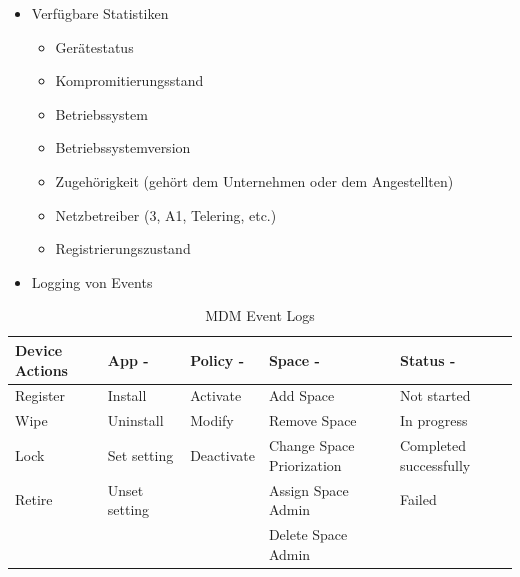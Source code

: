 \begin{itemize}
\begin{itemize}
		\item Verfügbare Statistiken 
		\begin{itemize}
			\item Gerätestatus
			\item Kompromitierungsstand
			\item Betriebssystem
			\item Betriebssystemversion
			\item Zugehörigkeit (gehört dem Unternehmen oder dem Angestellten)
			\item Netzbetreiber (3, A1, Telering, etc.)
			\item Registrierungszustand 
		\end{itemize}
		\item Logging von Events
	\end{itemize}
\end{itemize}	

\begin{table}[h]
\centering
\begin{tabular}{|l|l|l|l|l|}
\hline
\textbf{Device Actions} & \textbf{App -} & \textbf{Policy -} & \textbf{Space -}          & \textbf{Status -}      \\ \hline
Register                & Install        & Activate          & Add Space                 & Not started            \\ \hline
Wipe                    & Uninstall      & Modify            & Remove Space              & In progress            \\ \hline
Lock                    & Set setting    & Deactivate        & Change Space Priorization & Completed successfully \\ \hline
Retire                  & Unset setting  &                   & Assign Space Admin        & Failed                 \\ \hline
                        &                &                   & Delete Space Admin        &                        \\ \hline
\end{tabular}
\caption{MDM Event Logs}
\end{table}

\newpage

